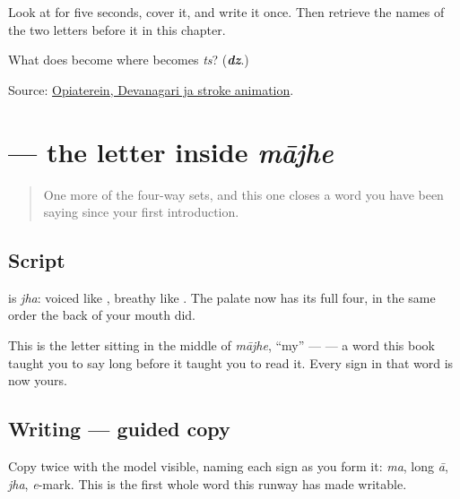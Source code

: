 Look at \textbf{} for five seconds, cover it, and write it once. Then retrieve the names of the two letters before it in this chapter.

\begin{tcolorbox}[breakable,colback=teal!4,colframe=teal!35!black,title={Before you move on}]
What does \textbf{} become where \textbf{} becomes \emph{ts}? (\emph{\textbf{dz}}.)

Source: \href{https://commons.wikimedia.org/wiki/File:Deva-\%E0\%A4\%9C-order.gif}{Opiaterein, Devanagari ja stroke animation}.
\end{tcolorbox}
\section[\texorpdfstring{\mr{झ} (jha)}{झ (jha)}]{ — the letter inside \emph{mājhe}}

\label{lesson:MR-W06-jha}



\begin{quote}
One more of the four-way sets, and this one closes a word you have been saying since your first introduction.
\end{quote}

\subsection*{Script}
\begin{quote}
\end{quote}

\textbf{} is \emph{jha}: voiced like \textbf{}, breathy like \textbf{}. The palate now has its full four, in the same order the back of your mouth did.

This is the letter sitting in the middle of \emph{mājhe}, \textquotedblleft{}my\textquotedblright{} — \textbf{} — a word this book taught you to say long before it taught you to read it. Every sign in that word is now yours.

\subsection*{Writing — guided copy}

Copy \textbf{} twice with the model visible, naming each sign as you form it: \emph{ma}, long \emph{ā}, \emph{jha}, \emph{e}-mark. This is the first whole word this runway has made writable.

